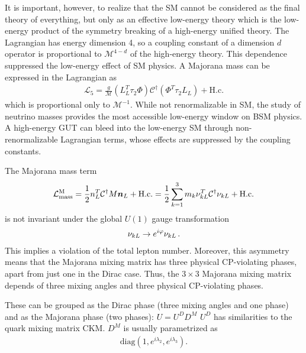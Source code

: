 \documentclass[twocolumn]{article}
\begin{document}
It is important, however, to realize that the SM cannot be considered as
the final theory of everything, but only as an effective low-energy theory which is
the low-energy product of the symmetry breaking of a high-energy unified theory. The Lagrangian has energy dimension 4, so a coupling constant of a dimension $d$ operator is proportional to $\mathcal{M}^{4-d}$ of the high-energy theory. This dependence suppressed the low-energy effect of SM physics. A Majorana mass can be expressed in the Lagrangian as 
\begin{align*}
  \mathcal{L}_{5}=\frac{g}{\mathcal{M}}\left(L_{L}^{T} \tau_{2} \Phi\right) \mathcal{C}^{\dagger}\left(\Phi^{T} \tau_{2} L_{L}\right)+\mathrm{H.c.}
\end{align*}
which is proportional only to $\mathcal{M}^{-1}$. While not renormalizable in SM, the study of neutrino masses provides the most accessible low-energy window on BSM physics. A high-energy GUT can bleed into the low-energy SM through non-renormalizable Lagrangian terms, whose effects are suppressed by the coupling constants.

The Majorana mass term 
\begin{align*}
  \mathcal{L}_{\mathrm{mass}}^{\mathrm{M}}=\frac{1}{2} n_{L}^{T} \mathcal{C}^{\dagger} M \boldsymbol{n}_{L}+\mathrm{H.c.}=\frac{1}{2} \sum_{k=1}^{3} m_{k} \nu_{kL}^{T} \mathcal{C}^{\dagger} \nu_{k L}+\mathrm{H.c.}
\end{align*}
is not invariant under the global $U(1)$ gauge transformation
\begin{align*}
  \nu_{k L} \to e^{i \varphi} \nu_{k L}\,.
\end{align*}
This implies a violation of the total lepton number. Moreover, this asymmetry means that the Majorana mixing matrix has three physical CP-violating phases, apart from just one in the Dirac case. Thus, the $3 \times 3$ Majorana mixing matrix depends of three mixing angles and three physical CP-violating phases. 

These can be grouped as the Dirac phase (three mixing angles and one phase) and as the Majorana phase (two phases):
$U=U^D D^M$
$U^D$ has similarities to the quark mixing matrix CKM. $D^M$ is usually parametrized as 
\begin{align*}
  \text{diag}(1, e^{i \lambda_2},e^{i \lambda_3})
.\end{align*} 
\end{document}

